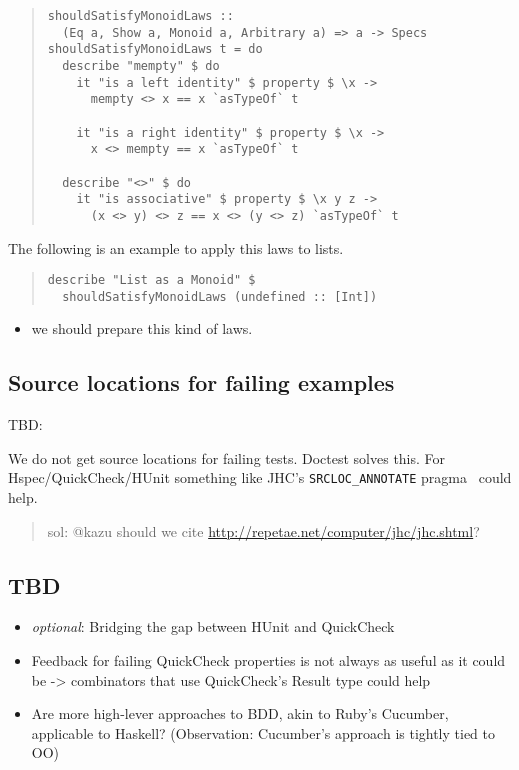 \documentclass[preprint]{sigplanconf}
\begin{document}
\begin{quote}
\small
\begin{verbatim}
shouldSatisfyMonoidLaws ::
  (Eq a, Show a, Monoid a, Arbitrary a) => a -> Specs
shouldSatisfyMonoidLaws t = do
  describe "mempty" $ do
    it "is a left identity" $ property $ \x ->
      mempty <> x == x `asTypeOf` t

    it "is a right identity" $ property $ \x ->
      x <> mempty == x `asTypeOf` t

  describe "<>" $ do
    it "is associative" $ property $ \x y z ->
      (x <> y) <> z == x <> (y <> z) `asTypeOf` t
\end{verbatim}
\end{quote}

\noindent The following is an example to apply this laws
to lists.

\begin{quote}
\small
\begin{verbatim}
describe "List as a Monoid" $
  shouldSatisfyMonoidLaws (undefined :: [Int])
\end{verbatim}
\end{quote}

\begin{itemize}
\item we should prepare this kind of laws.
\end{itemize}

\subsection{Source locations for failing examples}

TBD:

We do not get source locations for failing tests. Doctest solves this.
For Hspec/QuickCheck/HUnit something like JHC's
\verb|SRCLOC_ANNOTATE|
pragma~\cite{todo}
could help.

\begin{quote}
    sol: @kazu should we cite
    \url{http://repetae.net/computer/jhc/jhc.shtml}?
\end{quote}

\subsection{TBD}

\begin{itemize}
    \item \emph{optional}: Bridging the gap between HUnit and QuickCheck
    \item
        Feedback for failing QuickCheck properties is not always as
        useful as it could be -> combinators that use QuickCheck's
        Result type could help
    \item
        Are more high-lever approaches to BDD, akin to Ruby's
        Cucumber, applicable to Haskell? (Observation: Cucumber's
        approach is tightly tied to OO)
\end{itemize}
\end{document}
